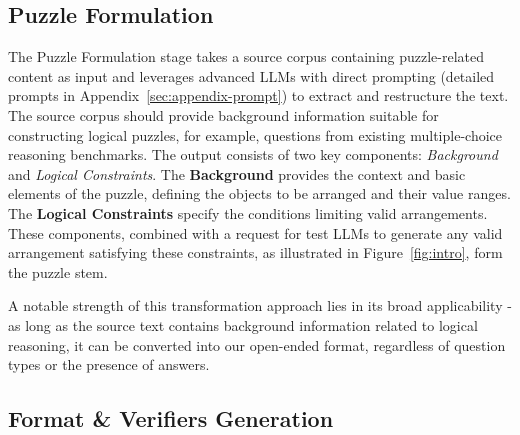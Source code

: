 

\label{sec:question_trans}
\subsection{Puzzle Formulation}

The Puzzle Formulation stage takes a source corpus containing puzzle-related content as input and leverages advanced LLMs with direct prompting (detailed prompts in Appendix~\ref{sec:appendix-prompt}) to extract and restructure the text. The source corpus should provide background information suitable for constructing logical puzzles, for example, questions from existing multiple-choice reasoning benchmarks.
The output consists of two key components: \emph{Background} and \emph{Logical Constraints}. The \textbf{Background} provides the context and basic elements of the puzzle, defining the objects to be arranged and their value ranges. The \textbf{Logical Constraints} specify the conditions limiting valid arrangements. These components, combined with a request for test LLMs to generate any valid arrangement satisfying these constraints, as illustrated in Figure~\ref{fig:intro}, form the puzzle stem.

A notable strength of this transformation approach lies in its broad applicability - as long as the source text contains background information related to logical reasoning, it can be converted into our open-ended format, regardless of question types or the presence of answers.

\subsection{Format \& Verifiers Generation}

